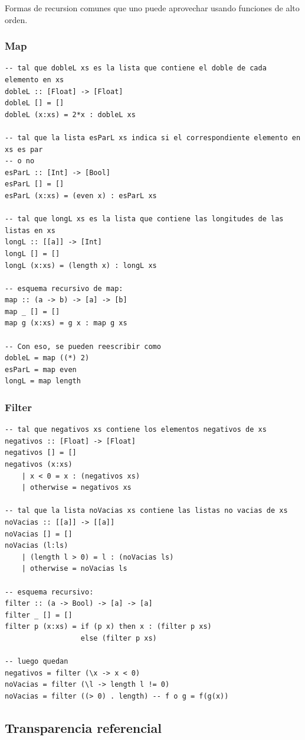 \documentclass{report}
\theoremstyle{definition} %
\begin{document}
Formas de recursion comunes que uno puede aprovechar usando funciones de alto
orden.

\subsubsection{Map}

\begin{verbatim}
-- tal que dobleL xs es la lista que contiene el doble de cada elemento en xs
dobleL :: [Float] -> [Float]
dobleL [] = []
dobleL (x:xs) = 2*x : dobleL xs

-- tal que la lista esParL xs indica si el correspondiente elemento en xs es par
-- o no
esParL :: [Int] -> [Bool] 
esParL [] = []
esParL (x:xs) = (even x) : esParL xs

-- tal que longL xs es la lista que contiene las longitudes de las listas en xs
longL :: [[a]] -> [Int]
longL [] = []
longL (x:xs) = (length x) : longL xs

-- esquema recursivo de map:
map :: (a -> b) -> [a] -> [b]
map _ [] = []
map g (x:xs) = g x : map g xs

-- Con eso, se pueden reescribir como
dobleL = map ((*) 2)
esParL = map even
longL = map length
\end{verbatim}

\subsubsection{Filter}

\begin{verbatim}
-- tal que negativos xs contiene los elementos negativos de xs
negativos :: [Float] -> [Float]
negativos [] = []
negativos (x:xs)
    | x < 0 = x : (negativos xs)
    | otherwise = negativos xs

-- tal que la lista noVacias xs contiene las listas no vacias de xs
noVacias :: [[a]] -> [[a]]
noVacias [] = []
noVacias (l:ls)
    | (length l > 0) = l : (noVacias ls)
    | otherwise = noVacias ls

-- esquema recursivo:
filter :: (a -> Bool) -> [a] -> [a]
filter _ [] = []
filter p (x:xs) = if (p x) then x : (filter p xs)
                  else (filter p xs)

-- luego quedan
negativos = filter (\x -> x < 0)
noVacias = filter (\l -> length l != 0)
noVacias = filter ((> 0) . length) -- f o g = f(g(x))

\end{verbatim}

\subsection{Transparencia referencial}
\end{document}
